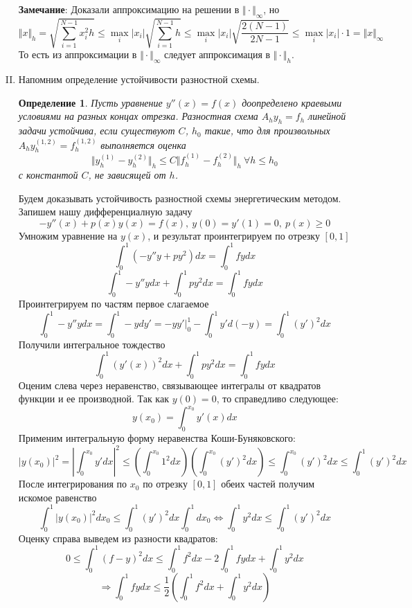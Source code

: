 \documentclass[12pt]{article}
\newtheorem*{definition}{Определение}
\begin{document}
\begin{enumerate}[I.]
	      \textbf{Замечание}: Доказали аппроксимацию на решении в $\Vert\cdot\Vert_{\infty}$, но
	      \[\Vert x\Vert_h=\sqrt{\sum_{i=1}^{N-1}x_i^2h}\leq\max_i|x_i|\sqrt{\sum_{i=1}^{N-1}h}\leq\max_i|x_i|\sqrt{\frac{2(N-1)}{2N-1}}\leq\max_i|x_i|\cdot1=\Vert x\Vert_{\infty}\]
	      То есть из аппроксимации в $\Vert\cdot\Vert_{\infty}$ следует аппроксимация в $\Vert\cdot\Vert_h$.

	      \newpage

	\item Напомним определение устойчивости разностной схемы.
	      \begin{definition}
		      Пусть уравнение $y''(x)=f(x)$ доопределено краевыми
		      условиями на разных концах отрезка. Разностная схема
		      $A_hy_h = f_h$ линейной задачи устойчива, если существуют $C$, $h_0$ такие, что для
		      произвольных $A_hy^{(1,2)}_h = f^{(1,2)}_h$ выполняется оценка
		      \[\Vert y^{(1)}_h-y^{(2)}_h\Vert_h\leq C\Vert f^{(1)}_h -f^{(2)}_h\Vert_h\ \forall h\leq h_0\]
		      с константой $C$, не зависящей от $h$.
	      \end{definition}

	      Будем доказывать устойчивость разностной схемы энергетическим методом.
	      Запишем нашу дифференциалную задачу
	      \[-y''(x)+p(x)y(x)=f(x),\ y(0) = y'(1) = 0,\ p(x)\geq 0\]
	      Умножим уравнение на $y(x)$, и результат проинтегрируем по отрезку $[0, 1]$
	      \[\int_0^1 (-y''y+py^2)dx = \int_0^1fydx \]
	      \[\int_0^1 -y''ydx+ \int_0^1py^2 dx = \int_0^1fydx \]
	      Проинтегрируем по частям первое слагаемое
	      \[\int_0^1 -y''ydx = \int_0^1-ydy' = -yy'\vert^1_0 - \int_0^1y'd(-y) = \int_0^1(y')^2dx\]
	      Получили интегральное тождество
	      \[\int_0^1 (y'(x))^2dx+ \int_0^1py^2 dx = \int_0^1fydx \]
	      Оценим слева через неравенство, связывающее интегралы от квадратов
	      функции и ее производной. Так как $y(0) = 0$, то справедливо следующее:
	      \[y(x_0) = \int_0^{x_0}y'(x)dx\]
	      Применим интегральную форму неравенства Коши-Буняковского:
	      \[|y(x_0)|^2 = \left|\int_0^{x_0}y'dx\right|^2\leq\left(\int_0^{x_0}1^2dx\right)\left(\int_0^{x_0}(y')^2dx\right)\leq\int_0^{x_0}(y')^2dx\leq\int_0^{1}(y')^2dx\]
	      После интегрирования по $x_0$ по отрезку $[0,1]$ обеих частей получим искомое равенство
	      \[\int_0^1|y(x_0)|^2dx_0 \leq \int_0^{1}(y')^2dx\int_0^1dx_0 \Leftrightarrow \int_0^1y^2dx\leq\int_0^1(y')^2dx\]
	      Оценку справа выведем из разности квадратов:
	      \[0\leq\int_0^1(f - y)^2dx\leq\int_0^1f^2dx-2\int_0^1fydx+\int_0^1y^2dx\]
	      \[\Rightarrow\int_0^1fydx\leq\frac{1}{2}\left(\int_0^1f^2dx + \int_0^1y^2dx\right)\]


\end{enumerate}
\end{document}
